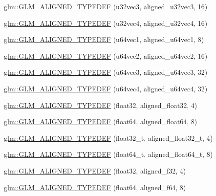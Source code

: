 \begin{DoxyCompactItemize}
\item 
\hyperlink{group__gtx__type__aligned_ga0019500abbfa9c66eff61ca75eaaed94}{glm\+::\+G\+L\+M\+\_\+\+A\+L\+I\+G\+N\+E\+D\+\_\+\+T\+Y\+P\+E\+D\+E\+F} (u32vec3, aligned\+\_\+u32vec3, 16)
\item 
\hyperlink{group__gtx__type__aligned_ga14fd29d01dae7b08a04e9facbcc18824}{glm\+::\+G\+L\+M\+\_\+\+A\+L\+I\+G\+N\+E\+D\+\_\+\+T\+Y\+P\+E\+D\+E\+F} (u32vec4, aligned\+\_\+u32vec4, 16)
\item 
\hyperlink{group__gtx__type__aligned_gab253845f534a67136f9619843cade903}{glm\+::\+G\+L\+M\+\_\+\+A\+L\+I\+G\+N\+E\+D\+\_\+\+T\+Y\+P\+E\+D\+E\+F} (u64vec1, aligned\+\_\+u64vec1, 8)
\item 
\hyperlink{group__gtx__type__aligned_ga929427a7627940cdf3304f9c050b677d}{glm\+::\+G\+L\+M\+\_\+\+A\+L\+I\+G\+N\+E\+D\+\_\+\+T\+Y\+P\+E\+D\+E\+F} (u64vec2, aligned\+\_\+u64vec2, 16)
\item 
\hyperlink{group__gtx__type__aligned_gae373b6c04fdf9879f33d63e6949c037e}{glm\+::\+G\+L\+M\+\_\+\+A\+L\+I\+G\+N\+E\+D\+\_\+\+T\+Y\+P\+E\+D\+E\+F} (u64vec3, aligned\+\_\+u64vec3, 32)
\item 
\hyperlink{group__gtx__type__aligned_ga53a8a03dca2015baec4584f45b8e9cdc}{glm\+::\+G\+L\+M\+\_\+\+A\+L\+I\+G\+N\+E\+D\+\_\+\+T\+Y\+P\+E\+D\+E\+F} (u64vec4, aligned\+\_\+u64vec4, 32)
\item 
\hyperlink{group__gtx__type__aligned_gab3301bae94ef5bf59fbdd9a24e7d2a01}{glm\+::\+G\+L\+M\+\_\+\+A\+L\+I\+G\+N\+E\+D\+\_\+\+T\+Y\+P\+E\+D\+E\+F} (float32, aligned\+\_\+float32, 4)
\item 
\hyperlink{group__gtx__type__aligned_ga75930684ff2233171c573e603f216162}{glm\+::\+G\+L\+M\+\_\+\+A\+L\+I\+G\+N\+E\+D\+\_\+\+T\+Y\+P\+E\+D\+E\+F} (float64, aligned\+\_\+float64, 8)
\item 
\hyperlink{group__gtx__type__aligned_gada9b0bea273d3ae0286f891533b9568f}{glm\+::\+G\+L\+M\+\_\+\+A\+L\+I\+G\+N\+E\+D\+\_\+\+T\+Y\+P\+E\+D\+E\+F} (float32\+\_\+t, aligned\+\_\+float32\+\_\+t, 4)
\item 
\hyperlink{group__gtx__type__aligned_ga6e3a2d83b131336219a0f4c7cbba2a48}{glm\+::\+G\+L\+M\+\_\+\+A\+L\+I\+G\+N\+E\+D\+\_\+\+T\+Y\+P\+E\+D\+E\+F} (float64\+\_\+t, aligned\+\_\+float64\+\_\+t, 8)
\item 
\hyperlink{group__gtx__type__aligned_gadbce23b9f23d77bb3884e289a574ebd5}{glm\+::\+G\+L\+M\+\_\+\+A\+L\+I\+G\+N\+E\+D\+\_\+\+T\+Y\+P\+E\+D\+E\+F} (float32, aligned\+\_\+f32, 4)
\item 
\hyperlink{group__gtx__type__aligned_gaa4deaa0dea930c393d55e7a4352b0a20}{glm\+::\+G\+L\+M\+\_\+\+A\+L\+I\+G\+N\+E\+D\+\_\+\+T\+Y\+P\+E\+D\+E\+F} (float64, aligned\+\_\+f64, 8)

\end{DoxyCompactItemize}
